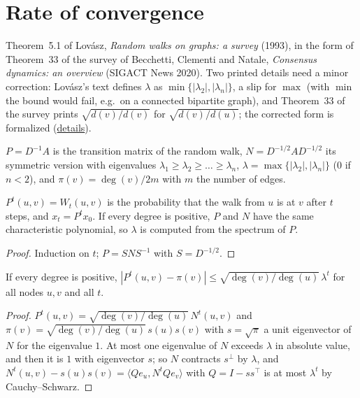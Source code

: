 \section{Rate of convergence}\label{sec:lovasz}
Theorem~5.1 of Lovász, \emph{Random walks on graphs: a survey} (1993), in the form of
Theorem~33 of the survey of Becchetti, Clementi and Natale, \emph{Consensus dynamics: an
overview} (SIGACT News 2020). Two printed details need a minor correction: Lovász's text defines
$\lambda$ as $\min\{|\lambda_2|,|\lambda_n|\}$, a slip for $\max$ (with $\min$ the bound would
fail, e.g.\ on a connected bipartite graph), and Theorem~33 of the survey prints
$\sqrt{d(v)/d(v)}$ for $\sqrt{d(v)/d(u)}$; the corrected form is formalized
(\href{https://github.com/formal-dynamics/leanamics/blob/main/averaging/FORMALIZATION_DIFFERENCES.md#rate-bound-and-sequential-averaging-rate-sequential-avg-1}{details}).
\begin{definition}\label{def:walk}
\leanok{}
$P=D^{-1}A$ is the transition matrix of the random walk, $N=D^{-1/2}AD^{-1/2}$ its symmetric
version with eigenvalues $\lambda_1\ge\lambda_2\ge\dots\ge\lambda_n$,
$\lambda=\max\{|\lambda_2|,|\lambda_n|\}$ ($0$ if $n<2$), and $\pi(v)=\deg(v)/2m$ with $m$ the
number of edges.
\end{definition}
\begin{lemma}\label{lem:walk-bridges}
\leanok{}
$P^t(u,v)=W_t(u,v)$ is the probability that the walk from $u$ is at $v$ after $t$ steps, and
$x_t=P^tx_0$. If every degree is positive, $P$ and $N$ have the same characteristic polynomial,
so $\lambda$ is computed from the spectrum of $P$.
\end{lemma}
\begin{proof}\leanok
Induction on $t$; $P=SNS^{-1}$ with $S=D^{-1/2}$.
\end{proof}
\begin{theorem}\label{thm:lovasz}
\leanok{}
If every degree is positive, $|P^t(u,v)-\pi(v)|\le\sqrt{\deg(v)/\deg(u)}\,\lambda^t$ for all
nodes $u,v$ and all $t$.
\end{theorem}
\begin{proof}\leanok
$P^t(u,v)=\sqrt{\deg(v)/\deg(u)}\,N^t(u,v)$ and $\pi(v)=\sqrt{\deg(v)/\deg(u)}\,s(u)s(v)$ with
$s=\sqrt\pi$ a unit eigenvector of $N$ for the eigenvalue $1$. At most one eigenvalue of $N$
exceeds $\lambda$ in absolute value, and then it is $1$ with eigenvector $s$; so $N$ contracts
$s^\perp$ by $\lambda$, and $N^t(u,v)-s(u)s(v)=\langle Qe_u,N^tQe_v\rangle$ with $Q=I-ss^\top$
is at most $\lambda^t$ by Cauchy--Schwarz.
\end{proof}
